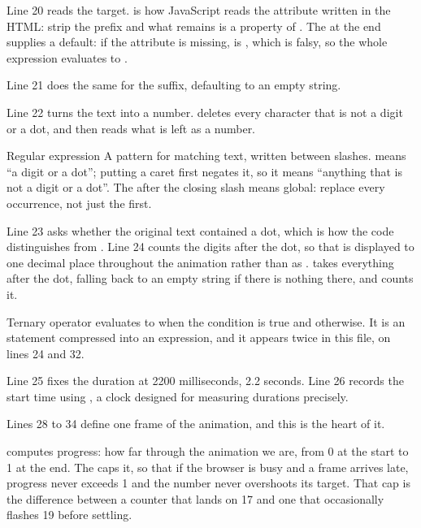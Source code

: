 Line 20 reads the target.  is how JavaScript reads the
attribute  written in the HTML: strip the  prefix
and what remains is a property of . The  at the end
supplies a default: if the attribute is missing,  is
, which is falsy, so the whole expression evaluates to
.

Line 21 does the same for the suffix, defaulting to an empty string.

Line 22 turns the text into a number. 
deletes every character that is not a digit or a dot, and  then
reads what is left as a number.

\begin{jargon}{Regular expression}
A pattern for matching text, written between slashes. \code{[0-9.]} means ``a
digit or a dot''; putting a caret first negates it, so it means ``anything that
is not a digit or a dot''. The  after the closing slash means global:
replace every occurrence, not just the first.
\end{jargon}

Line 23 asks whether the original text contained a dot, which is how the code
distinguishes  from . Line 24 counts the digits after the dot,
so that  is displayed to one decimal place throughout the animation
rather than as .  takes everything
after the dot, falling back to an empty string if there is nothing there, and
 counts it.

\begin{jargon}{Ternary operator}
 evaluates to  when the condition is true and
 otherwise. It is an  statement compressed into an expression,
and it appears twice in this file, on lines 24 and 32.
\end{jargon}

Line 25 fixes the duration at 2200 milliseconds, 2.2 seconds. Line 26 records the
start time using , a clock designed for measuring
durations precisely.

Lines 28 to 34 define one frame of the animation, and this is the heart of it.

 computes progress: how far
through the animation we are, from 0 at the start to 1 at the end. The
 caps it, so that if the browser is busy and a frame
arrives late, progress never exceeds 1 and the number never overshoots its target.
That cap is the difference between a counter that lands on 17 and one that
occasionally flashes 19 before settling.

